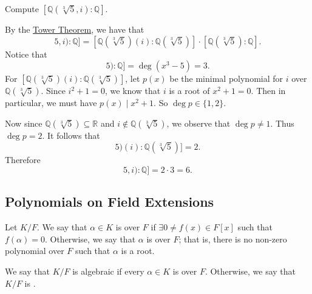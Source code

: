 \documentclass[notoc,notitlepage,nobib]{tufte-book}
\begin{document}
\begin{eg}
  Compute $[\mathbb{Q}(\sqrt[3]{5}, i) : \mathbb{Q}]$.
\end{eg}

\begin{solution}
  By the \hyperref[thm:tower_theorem]{Tower Theorem}, we have that
  \begin{equation*}
    [\mathbb{Q}(\sqrt[3]{5}, i) : \mathbb{Q}] 
      = [\mathbb{Q}(\sqrt[3]{5})(i) : \mathbb{Q}(\sqrt[3]{5})] \cdot [\mathbb{Q}(\sqrt[3]{5}) : \mathbb{Q}].
  \end{equation*}
  Notice that
  \begin{equation*}
    [\mathbb{Q}(\sqrt[3]{5}) : \mathbb{Q}] = \deg ( x^3 - 5 ) = 3.
  \end{equation*}
  For $[\mathbb{Q}(\sqrt[3]{5})(i) : \mathbb{Q}(\sqrt[3]{5})]$, let $p(x)$ be the minimal polynomial for $i$
  over $\mathbb{Q}(\sqrt[3]{5})$. Since $i^2 + 1 = 0$, we know that $i$ is a root of $x^2 + 1 = 0$. Then in
  particular, we must have $p(x) \mid x^2 + 1$. So $\deg p \in \{ 1, 2 \}$.

  Now since $\mathbb{Q}(\sqrt[3]{5}) \subseteq \mathbb{R}$ and $i \notin \mathbb{Q}(\sqrt[3]{5})$, we observe
  that $\deg p \neq 1$. Thus $\deg p = 2$. It follows that
  \begin{equation*}
    [\mathbb{Q}(\sqrt[3]{5})(i) : \mathbb{Q}(\sqrt[3]{5})] = 2.
  \end{equation*}
  Therefore
  \begin{equation*}
    [\mathbb{Q}(\sqrt[3]{5}, i) : \mathbb{Q}]  = 2 \cdot 3 = 6.
  \end{equation*}
\end{solution}


\subsection{Polynomials on Field Extensions}%
\label{sub:polynomials_on_field_extensions}

\begin{defn}\label{defn:algebraic_and_transcendental}
  Let $K / F$. We say that $\alpha \in K$ is  over $F$ if $\exists 0 \neq f(x) \in F[x]$
  such that $f(\alpha) = 0$. Otherwise, we say that $\alpha$ is  over $F$; that is,
  there is no non-zero polynomial over $F$ such that $\alpha$ is a root.

  We say that $K / F$ is algebraic if every $\alpha \in K$ is  over $F$. Otherwise, we
  say that $K / F$ is .
\end{defn}
\end{document}
